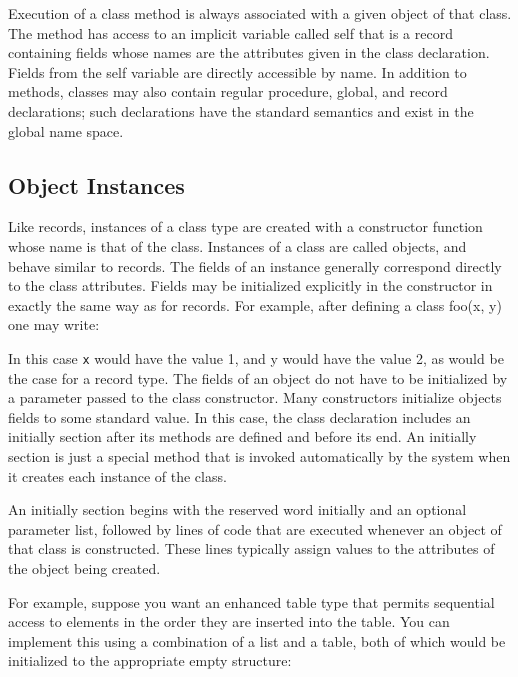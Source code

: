 Execution of a class method is always associated with a given object of
that class. The method has access to an implicit
variable called
\textsf{self} that is a record containing fields whose
names are the attributes given in the class declaration. Fields from
the \textsf{self} variable are directly accessible by name. In addition
to methods, classes may also contain regular procedure, global, and
record declarations; such declarations have the standard semantics and
exist in the global name space. 

\subsection{Object Instances}

Like records, instances of a class type
are created with a constructor function whose
name is that of the class. Instances of a class are called objects, and
behave similar to records. The fields of an instance generally
correspond directly to the class attributes. Fields may be initialized
explicitly in the constructor in exactly the same way as for records.
For example, after defining a \textsf{class foo(x, y)} one may write: 


In this case \texttt{x} would have the value \textsf{1}, and \textsf{y}
would have the value \textsf{2}, as would be the case for a record
type. The fields of an object do not have to be initialized by a
parameter passed to the class constructor. Many constructors initialize
objects{\textquotesingle} fields to some standard value. In this case,
the class declaration includes an \textsf{initially}
section after its methods are defined and before its end. An
\textsf{initially} section is just a special method that is invoked
automatically by the system when it creates each instance of the class.

An \textsf{initially} section begins with the reserved word
\textsf{initially} and an optional parameter list, followed by lines of
code that are executed whenever an object of that class is constructed.
These lines typically assign values to the attributes of the object
being created.

For example, suppose you want an enhanced table type that permits
sequential access to elements in the order they are inserted into the
table. You can implement this using a combination of a list and a
table, both of which would be initialized to the appropriate empty
structure: 

